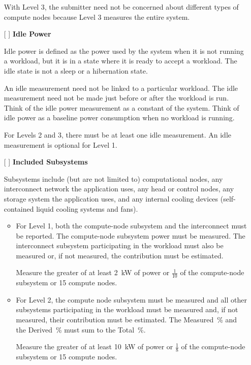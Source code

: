\begin{itemize}
With Level 3, the submitter need not be concerned about different types of compute nodes because Level 3 measures the entire system.


\item[{[ ]}]
\textbf{Idle Power}

Idle power is defined as the power used by the system when it is not running a workload, but it is in a state where it is ready to accept a workload. The idle state is not a sleep or a hibernation state.

An idle measurement need not be linked to a particular workload. The idle measurement need not be made just before or after the workload is run. Think of the idle power measurement as a constant of the system. Think of idle power as a baseline power consumption when no workload is running. 

For Levels 2 and 3, there must be at least one idle measurement. An idle measurement is optional for Level 1. 

\newpage
\item[{[ ]}]
\textbf{Included Subsystems}

Subsystems include (but are not limited to) computational nodes, any interconnect network the application uses, any head or control nodes, any storage system the application uses, and any internal cooling devices (self-contained liquid cooling systems and fans).  

\begin{itemize}
\item
For Level 1, both the compute-node subsystem and the interconnect must be reported.  
The compute-node subsystem power must be measured. 
The interconnect subsystem participating in the workload must also be measured or, if not measured, the contribution must be estimated.

Measure the greater of at least 2~kW of power or $\frac{1}{10}$ of the compute-node subsystem or 15 compute nodes.

\item
For Level 2, the compute node subsystem must be measured and all other subsystems participating in the workload must be measured and, if not measured, their contribution must be estimated.
The Measured~\% and the Derived~\% must sum to the Total~\%.

Measure the greater of at least 10~kW of power or $\frac{1}{8}$ of the compute-node subsystem or 15 compute nodes.


\end{itemize}
\end{itemize}
